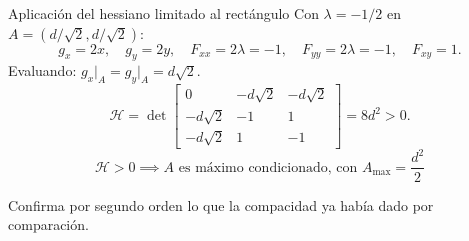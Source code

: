 \documentclass[11pt,aspectratio=169]{beamer}
\begin{document}
\begin{frame}{Aplicación del hessiano limitado al rectángulo}
  Con $\lambda=-1/2$ en $A=(d/\sqrt2,d/\sqrt2)$:
  \[
    g_x=2x,\quad g_y=2y,\quad
    F_{xx}=2\lambda=-1,\quad F_{yy}=2\lambda=-1,\quad F_{xy}=1.
  \]
  \pause
  Evaluando: $g_x\big|_A=g_y\big|_A=d\sqrt2$.
  \pause
  \[
    \mathcal H=\det\begin{bmatrix}
      0 & -d\sqrt2 & -d\sqrt2\\
      -d\sqrt2 & -1 & 1\\
      -d\sqrt2 & 1 & -1
    \end{bmatrix}=8d^2>0.
  \]
  \pause
  \[
    \boxed{\mathcal H>0 \implies A \text{ es máximo condicionado, con } A_{\max}=\frac{d^2}{2}}
  \]
  \pause
  \begin{center}\small\color{gray60} Confirma por segundo orden lo que la compacidad ya había dado por comparación.\end{center}
\end{frame}
\end{document}
